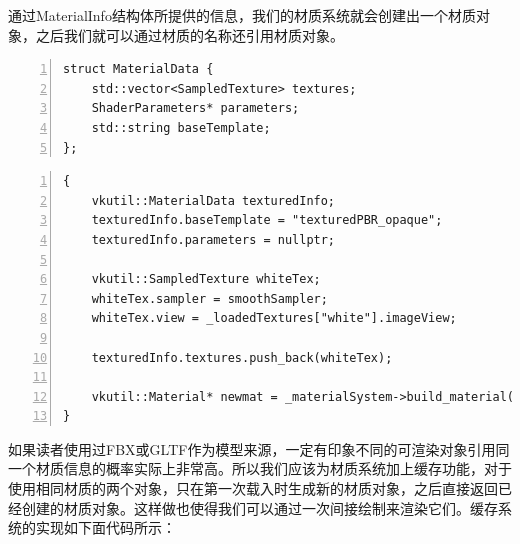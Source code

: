 \documentclass{ctexart}
\begin{document}
通过MaterialInfo结构体所提供的信息，我们的材质系统就会创建出一个材质对象，之后我们就可以通过材质的名称还引用材质对象。

\begin{lstlisting}[language={[ANSI]C},keywordstyle=\color{blue!70},commentstyle=\color{red!50!green!50!blue!50},frame=shadowbox, rulesepcolor=\color{red!20!green!20!blue!20},basicstyle=\small,numbers=left, numberstyle=\tiny,breaklines=true]
struct MaterialData {
	std::vector<SampledTexture> textures;
	ShaderParameters* parameters;
	std::string baseTemplate;
};
\end{lstlisting}

\begin{lstlisting}[language={[ANSI]C},keywordstyle=\color{blue!70},commentstyle=\color{red!50!green!50!blue!50},frame=shadowbox, rulesepcolor=\color{red!20!green!20!blue!20},basicstyle=\small,numbers=left, numberstyle=\tiny,breaklines=true]
{
	vkutil::MaterialData texturedInfo;
	texturedInfo.baseTemplate = "texturedPBR_opaque";
	texturedInfo.parameters = nullptr;

	vkutil::SampledTexture whiteTex;
	whiteTex.sampler = smoothSampler;
	whiteTex.view = _loadedTextures["white"].imageView;

	texturedInfo.textures.push_back(whiteTex);

	vkutil::Material* newmat = _materialSystem->build_material("textured", texturedInfo);
}
\end{lstlisting}

如果读者使用过FBX或GLTF作为模型来源，一定有印象不同的可渲染对象引用同一个材质信息的概率实际上非常高。所以我们应该为材质系统加上缓存功能，对于使用相同材质的两个对象，只在第一次载入时生成新的材质对象，之后直接返回已经创建的材质对象。这样做也使得我们可以通过一次间接绘制来渲染它们。缓存系统的实现如下面代码所示：
\end{document}
